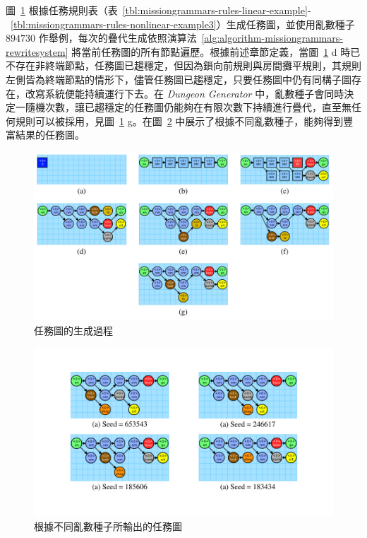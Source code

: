 圖~\ref{fig:mission-graph-generating-progress} 根據任務規則表（表~\ref{tbl:missiongrammars-rules-linear-example}-~\ref{tbl:missiongrammars-rules-nonlinear-example3}）生成任務圖，並使用亂數種子 $894730$ 作舉例，每次的疊代生成依照演算法~\ref{alg:algorithm-missiongrammars-rewritesystem} 將當前任務圖的所有節點遍歷。根據前述章節定義，當圖~\ref{fig:mission-graph-generating-progress} d 時已不存在非終端節點，任務圖已趨穩定，但因為鎖向前規則與房間攤平規則，其規則左側皆為終端節點的情形下，儘管任務圖已趨穩定，只要任務圖中仍有同構子圖存在，改寫系統便能持續運行下去。在 \textit{Dungeon Generator} 中，亂數種子會同時決定一隨機次數，讓已趨穩定的任務圖仍能夠在有限次數下持續進行疊代，直至無任何規則可以被採用，見圖~\ref{fig:mission-graph-generating-progress} g。在圖~\ref{fig:final-mission-graph} 中展示了根據不同亂數種子，能夠得到豐富結果的任務圖。

\begin{figure}[!htb]
  \begin{center}
    \includegraphics[width=1.0\textwidth]{figures/mission-graph-generating-progress.pdf}
    \caption{任務圖的生成過程}
    \label{fig:mission-graph-generating-progress}
  \end{center}
\end{figure}

\begin{figure}[!htb]
  \begin{center}
    \includegraphics[width=1.0\textwidth]{figures/final-mission-graph.pdf}
    \caption{根據不同亂數種子所輸出的任務圖}
    \label{fig:final-mission-graph}
  \end{center}
\end{figure}

